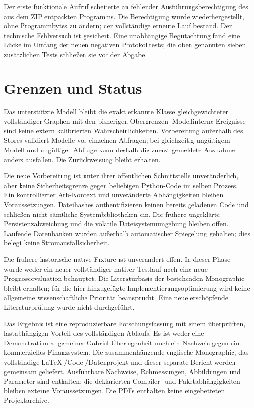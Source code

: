 \documentclass[11pt,a4paper]{article}
\begin{document}
Der erste funktionale Aufruf scheiterte an fehlender Ausführungsberechtigung des aus dem ZIP entpackten Programms. Die Berechtigung wurde wiederhergestellt, ohne Programmbytes zu ändern; der vollständige erneute Lauf bestand. Der technische Fehlversuch ist gesichert. Eine unabhängige Begutachtung fand eine Lücke im Umfang der neuen negativen Protokolltests; die oben genannten sieben zusätzlichen Tests schließen sie vor der Abgabe.

\section*{Grenzen und Status}
Das unterstützte Modell bleibt die exakt erkannte Klasse gleichgewichteter vollständiger Graphen mit den bisherigen Obergrenzen. Modellinterne Ereignisse sind keine extern kalibrierten Wahrscheinlichkeiten. Vorbereitung außerhalb des Stores validiert Modelle vor einzelnen Abfragen; bei gleichzeitig ungültigem Modell und ungültiger Abfrage kann deshalb die zuerst gemeldete Ausnahme anders ausfallen. Die Zurückweisung bleibt erhalten.

Die neue Vorbereitung ist unter ihrer öffentlichen Schnittstelle unveränderlich, aber keine Sicherheitsgrenze gegen beliebigen Python-Code im selben Prozess. Ein kontrollierter Arb-Kontext und unveränderte Abhängigkeiten bleiben Voraussetzungen. Dateihashes authentifizieren keinen bereits geladenen Code und schließen nicht sämtliche Systembibliotheken ein. Die frühere ungeklärte Persistenzabweichung und die volatile Dateisystemumgebung bleiben offen. Laufende Datenbanken wurden außerhalb automatischer Spiegelung gehalten; dies belegt keine Stromausfallsicherheit.

Die frühere historische native Fixture ist unverändert offen. In dieser Phase wurde weder ein neuer vollständiger nativer Testlauf noch eine neue Prognoseevaluation behauptet. Die Literaturbasis der bestehenden Monographie bleibt erhalten; für die hier hinzugefügte Implementierungsoptimierung wird keine allgemeine wissenschaftliche Priorität beansprucht. Eine neue erschöpfende Literaturprüfung wurde nicht durchgeführt.

Das Ergebnis ist eine reproduzierbare Forschungsfassung mit einem überprüften, lastabhängigen Vorteil des vollständigen Ablaufs. Es ist weder eine Demonstration allgemeiner Gabriel-Überlegenheit noch ein Nachweis gegen ein kommerzielles Finanzsystem. Die zusammenhängende englische Monographie, das vollständige LaTeX-/Code-/Datenprojekt und dieser separate Bericht werden gemeinsam geliefert. Ausführbare Nachweise, Rohmessungen, Abbildungen und Parameter sind enthalten; die deklarierten Compiler- und Paketabhängigkeiten bleiben externe Voraussetzungen. Die PDFs enthalten keine eingebetteten Projektarchive.
\end{document}
